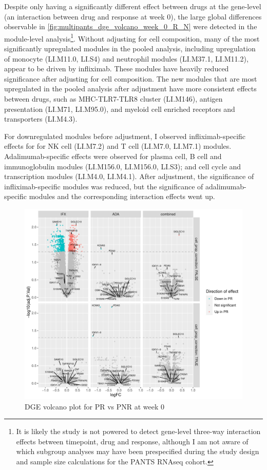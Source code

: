 \begin{outline}
Despite only  having a significantly different effect between drugs at the gene-level (an interaction between drug and response at week 0), 
the large global differences observable in \autoref{fig:multipants_dge_volcano_week_0_R_N} were detected in the module-level analysis\footnote{It is likely the study is not powered to detect gene-level three-way interaction effects between timepoint, drug and response, although I am not aware of which subgroup analyses may have been prespecified during the study design and sample size calculations for the \gls{PANTS} \gls{RNAseq} cohort.}.
Without adjusting for cell composition, many of the most significantly upregulated modules in the pooled analysis, 
including upregulation of monocyte (LI.M11.0, LI.S4) and neutrophil modules (LI.M37.1, LI.M11.2),
appear to be driven by infliximab.
These modules have heavily reduced significance after adjusting for cell composition.
The new modules that are most upregulated in the pooled analysis after adjustment have more consistent effects between drugs, such as
MHC-TLR7-TLR8 cluster (LI.M146), antigen presentation (LI.M71, LI.M95.0), and myeloid cell enriched receptors and transporters (LI.M4.3).

For downregulated modules before adjustment, I observed infliximab-specific effects for for NK cell (LI.M7.2) and T cell (LI.M7.0, LI.M7.1) modules.
Adalimumab-specific effects were observed for plasma cell, B cell and immunoglobulin modules (LI.M156.0, LI.M156.0, LI.S3); and cell cycle and transcription modules (LI.M4.0, LI.M4.1).
After adjustment, the significance of infliximab-specific modules was reduced, 
but the significance of adalimumab-specific modules and the corresponding interaction effects went up.

\begin{figure}
    \centering
    \includegraphics[width=1.0\textwidth,page=1]{mainmatter/figures/chapter_04/plot_gene_set_enrichment.dge_result_volcano_simple_C_1RI_1NI,C_1RA_1NA,C_1R_1N.pdf}
    \caption{DGE volcano plot for PR vs PNR at week 0}
    \label{fig:multipants_dge_volcano_week_0_R_N}
\end{figure}


\end{outline}
